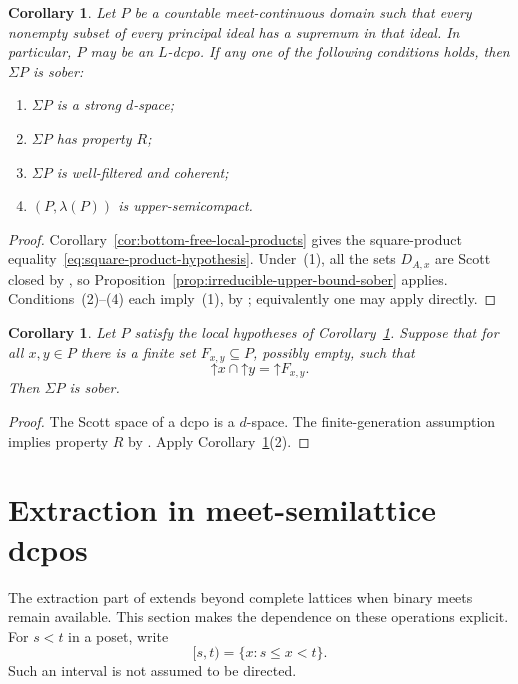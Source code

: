 \documentclass[10pt,a4paper]{amsart}
\newtheorem{corollary}[theorem]{Corollary}
\numberwithin{equation}{section}
\newcommand{\up}[1]{\mathord{\uparrow}#1}
\newcommand{\Sig}{\Sigma}
\begin{document}
\begin{corollary}\label{cor:conditional-sobriety}
Let $P$ be a countable meet-continuous domain such that every nonempty subset of every principal ideal has a supremum in that ideal. In particular, $P$ may be an $L$-dcpo. If any one of the following conditions holds, then $\Sig P$ is sober:
\begin{enumerate}[label=\textup{(\arabic*)}]
\item $\Sig P$ is a strong $d$-space;
\item $\Sig P$ has property $R$;
\item $\Sig P$ is well-filtered and coherent;
\item $(P,\lambda(P))$ is upper-semicompact.
\end{enumerate}
\end{corollary}
\begin{proof}
Corollary~\ref{cor:bottom-free-local-products} gives the square-product equality~\eqref{eq:square-product-hypothesis}. Under~(1), all the sets $D_{A,x}$ are Scott closed by \cite[Theorem~61]{LawsonXuLower}, so Proposition~\ref{prop:irreducible-upper-bound-sober} applies. Conditions~(2)--(4) each imply~(1), by \cite[Lemma~50\textup{(3)}, Proposition~33\textup{(2)}, and Proposition~42]{LawsonXuLower}; equivalently one may apply \cite[Theorem~76 and Corollary~77]{LawsonXuLower} directly.
\end{proof}

\begin{corollary}\label{cor:finite-upper-bound-generators}
Let $P$ satisfy the local hypotheses of Corollary~\ref{cor:conditional-sobriety}. Suppose that for all $x,y\in P$ there is a finite set $F_{x,y}\subseteq P$, possibly empty, such that
\[
 \up x\cap\up y=\up F_{x,y}.
\]
Then $\Sig P$ is sober.
\end{corollary}
\begin{proof}
The Scott space of a dcpo is a $d$-space. The finite-generation assumption implies property $R$ by \cite[Proposition~33\textup{(1)}]{LawsonXuLower}. Apply Corollary~\ref{cor:conditional-sobriety}\textup{(2)}.
\end{proof}

\section{Extraction in meet-semilattice dcpos}\label{sec:semilattice}
The extraction part of \cite{XuJi} extends beyond complete lattices when binary meets remain available. This section makes the dependence on these operations explicit. For $s<t$ in a poset, write
\[
 [s,t)=\{x:s\le x<t\}.
\]
Such an interval is not assumed to be directed.
\end{document}
